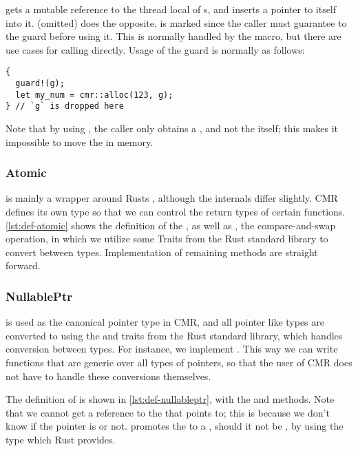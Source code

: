  gets a mutable reference to the thread local  of s,
and inserts a pointer to itself into it.  (omitted) does the opposite.
 is marked  since the caller must guarantee to  the
guard before using it. This is normally handled by the  macro, but there are use cases
for calling  directly. Usage of the guard is normally as follows:
\begin{lstlisting}[style=Rust]
{
  guard!(g);
  let my_num = cmr::alloc(123, g);
} // `g` is dropped here
\end{lstlisting}
Note that by using , the caller only obtains a , and not the
 itself; this makes it impossible to move the  in memory.


\subsubsection{Atomic}

 is mainly a wrapper around Rusts , although the internals differ
slightly. CMR defines its own type so that we can control the return types of certain functions.
\cref{lst:def-atomic} shows the definition of the , as well as , the
compare-and-swap operation, in which we utilize some Traits from the Rust standard library to
convert between types.  Implementation of remaining methods are straight forward.



\pagebreak
\subsubsection{NullablePtr}

 is used as the canonical pointer type in CMR, and all pointer like types are
converted to  using the  and  traits from the Rust standard
library, which handles conversion between types. For instance, we implement . This way we can write functions that are generic over all types of pointers, so
that the user of CMR does not have to handle these conversions themselves.


The definition of  is shown in \cref{lst:def-nullableptr}, with the 
and  methods. Note that we cannot get a reference to the  that 
points to; this is because we don't know if the pointer is  or not.  promotes
the  to a , should it not be , by using the 
type which Rust provides.

